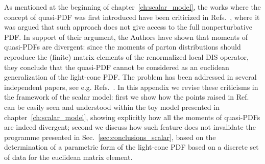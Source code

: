 As mentioned at the beginning of chapter~\ref{ch:scalar_model}, the works where the concept of
quasi-PDF was first introduced have been criticized in
Refs.~\cite{Rossi:2017muf, Rossi:2018zkn}, where it was argued that such
approach does not give access to the full nonperturbative PDF. In support of
their argument, the Authors have shown that moments of quasi-PDFs are divergent:
since the moments of parton distributions should reproduce the (finite) matrix
elements of the renormalized local DIS operator, they conclude that the
quasi-PDF cannot be considered as an euclidean generalization of the light-cone
PDF. The problem has been addressed in several independent papers, see e.g.
Refs.~\cite{Ji:2017rah, Radyushkin:2018nbf, Karpie:2018zaz}. In this appendix we
revise these criticisms in the framework of the scalar model: first we show how
the points raised in Ref.~\cite{Rossi:2017muf, Rossi:2018zkn} can be easily seen
and understood within the toy model presented in chapter~\ref{ch:scalar_model}, showing explicitly
how all the moments of quasi-PDFs are indeed divergent; second we discuss how
such feature does not invalidate the programme presented in
Sec.~\ref{sec:conclusions_scalar}, based on the determination of a parametric form of
the light-cone PDF based on a discrete set of data for the euclidean matrix
element.

